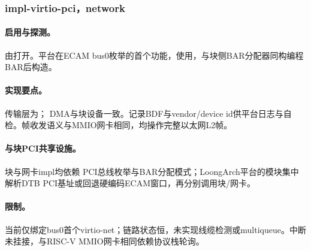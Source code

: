 
\subsubsection{impl-virtio-pci，network}

\paragraph{启用与探测。}由打开。平台在ECAM bus0枚举的首个功能，使用，与块侧BAR分配器同构编程BAR后构造。

\paragraph{实现要点。}传输层为； DMA与块设备一致。记录BDF与vendor/device id供平台日志与自检。帧收发语义与MMIO网卡相同，均操作完整以太网L2帧。

\paragraph{与块PCI共享设施。}块与网卡impl均依赖 PCI总线枚举与BAR分配模式；LoongArch平台的模块集中解析DTB PCI基址或回退硬编码ECAM窗口，再分别调用块/网卡。

\paragraph{限制。}当前仅绑定bus0首个virtio-net；链路状态恒，未实现线缆检测或multiqueue。中断未挂接，与RISC-V MMIO网卡相同依赖协议栈轮询。
